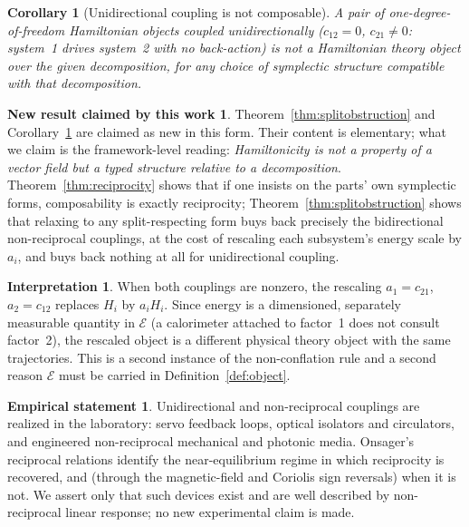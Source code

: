 \documentclass[10pt,a4paper]{article}
\theoremstyle{plain}
\newtheorem{corollary}[theorem]{Corollary}
\theoremstyle{definition}
\newtheorem{interpretation}[theorem]{Interpretation}
\newtheorem{empirical}[theorem]{Empirical statement}
\newtheorem{newresult}[theorem]{New result claimed by this work}
\begin{document}
\begin{corollary}[Unidirectional coupling is not composable]
\label{cor:unidirectional}
A pair of one-degree-of-freedom Hamiltonian objects coupled unidirectionally ($c_{12} = 0$, $c_{21}\neq 0$: system~1 drives system~2 with no back-action) is not a Hamiltonian theory object over the given decomposition, for any choice of symplectic structure compatible with that decomposition.
\end{corollary}

\begin{newresult}
\label{new:composition}
Theorem~\ref{thm:splitobstruction} and Corollary~\ref{cor:unidirectional} are claimed as new in this form. Their content is elementary; what we claim is the framework-level reading: \emph{Hamiltonicity is not a property of a vector field but a typed structure relative to a decomposition}. Theorem~\ref{thm:reciprocity} shows that if one insists on the parts' own symplectic forms, composability is exactly reciprocity; Theorem~\ref{thm:splitobstruction} shows that relaxing to any split-respecting form buys back precisely the bidirectional non-reciprocal couplings, at the cost of rescaling each subsystem's energy scale by $a_i$, and buys back nothing at all for unidirectional coupling.
\end{newresult}

\begin{interpretation}
\label{int:rescale}
When both couplings are nonzero, the rescaling $a_1=c_{21}$, $a_2=c_{12}$ replaces $H_i$ by $a_iH_i$. Since energy is a dimensioned, separately measurable quantity in $\mathcal{E}$ (a calorimeter attached to factor~1 does not consult factor~2), the rescaled object is a different physical theory object with the same trajectories. This is a second instance of the non-conflation rule and a second reason $\mathcal{E}$ must be carried in Definition~\ref{def:object}.
\end{interpretation}

\begin{empirical}
\label{emp:nonrecip}
Unidirectional and non-reciprocal couplings are realized in the laboratory: servo feedback loops, optical isolators and circulators, and engineered non-reciprocal mechanical and photonic media. Onsager's reciprocal relations \cite{Onsager1931} identify the near-equilibrium regime in which reciprocity is recovered, and (through the magnetic-field and Coriolis sign reversals) when it is not. We assert only that such devices exist and are well described by non-reciprocal linear response; no new experimental claim is made.
\end{empirical}
\end{document}
